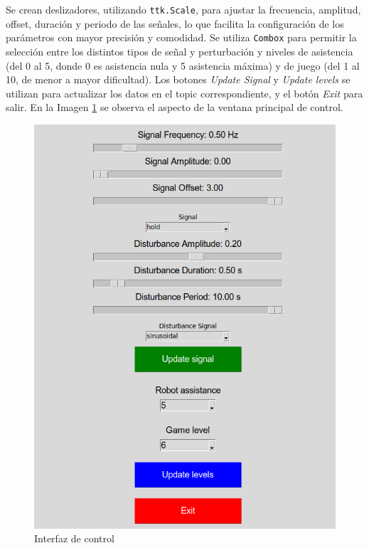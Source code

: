 Se crean deslizadores, utilizando \verb|ttk.Scale|, para ajustar la frecuencia, amplitud, offset, duración y periodo de las señales, lo que facilita la configuración de los parámetros con mayor precisión y comodidad.
Se utiliza \verb|Combox| para permitir la selección entre los distintos tipos de señal y perturbación y niveles de asistencia (del 0 al 5, donde 0 es asistencia nula y 5 asistencia máxima) y de juego (del 1 al 10, de menor a mayor dificultad).
Los botones \textit{Update Signal} y \textit{Update levels} se utilizan para actualizar los datos en el topic correspondiente, y el botón \textit{Exit} para salir.
En la Imagen \ref{fig:control} se observa el aspecto de la ventana principal de control.

\begin{figure}[ht!]
	\centering
	\begin{minipage}{0.55\linewidth}
		\centering
		\includegraphics[width=\linewidth]{figs/control_pannel.png}
	\end{minipage}
	\caption[Interfaz de control]{Interfaz de control}
	\label{fig:control}
\end{figure}

